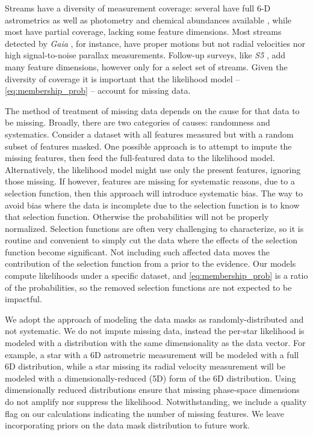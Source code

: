 \documentclass[twocolumn, linenumbers]{aastex631}
\newcommand{\dataarchive}[1]{\textit{#1}}
\newcommand{\Gaia}{\dataarchive{Gaia}}
\begin{document}
        Streams have a diversity of measurement coverage: several have full 6-D
        astrometrics as well as photometry and chemical abundances available
        \citep[e.g.,][]{Koposov+2019, Antoja+2020, Li+2022}, while most have
        partial coverage, lacking some feature dimensions.  Most streams
        detected by \Gaia{} \citep{Gaia2016, Gaia2023}, for instance, have proper
        motions but not radial velocities nor high signal-to-noise parallax
        measurements.  Follow-up surveys, like \dataarchive{S5} \citep{Li+2019},
        add many feature dimensions, however only for a select set of streams.
        Given the diversity of coverage it is important that the likelihood
        model -- \autoref{eq:membership_prob} -- account for missing data.

        The method of treatment of missing data depends on the cause for that
        data to be missing.  Broadly, there are two categories of causes:
        randomness and systematics.  Consider a dataset with all features
        measured but with a random subset of features masked.  One possible
        approach is to attempt to impute the missing features, then feed the
        full-featured data to the likelihood model. Alternatively, the
        likelihood model might use only the present features, ignoring those
        missing. If however, features are missing for systematic reasons, due to
        a selection function, then this approach will introduce systematic bias.
        The way to avoid bias where the data is incomplete due to the selection
        function is to know that selection function. Otherwise the probabilities
        will not be properly normalized.  Selection functions are often very
        challenging to characterize, so it is routine and convenient to simply
        cut the data where the effects of the selection function become
        significant.  Not including such affected data moves the contribution of
        the selection function from a prior to the evidence.  Our models compute
        likelihoods under a specific dataset, and \autoref{eq:membership_prob}
        is a ratio of the probabilities, so the removed selection functions are
        not expected to be impactful.

        We adopt the approach of modeling the data masks as randomly-distributed
        and not systematic. We do not impute missing data, instead the per-star
        likelihood is modeled with a distribution with the same dimensionality
        as the data vector.  For example, a star with a 6D astrometric
        measurement will be modeled with a full 6D distribution, while a star
        missing its radial velocity measurement will be modeled with a
        dimensionally-reduced (5D) form of the 6D distribution. Using
        dimensionally reduced distributions ensure that missing phase-space
        dimensions do not amplify nor suppress the likelihood.  Notwithstanding,
        we include a quality flag on our calculations indicating the number of
        missing features.  We leave incorporating priors on the data mask
        distribution to future work. 
\end{document}
